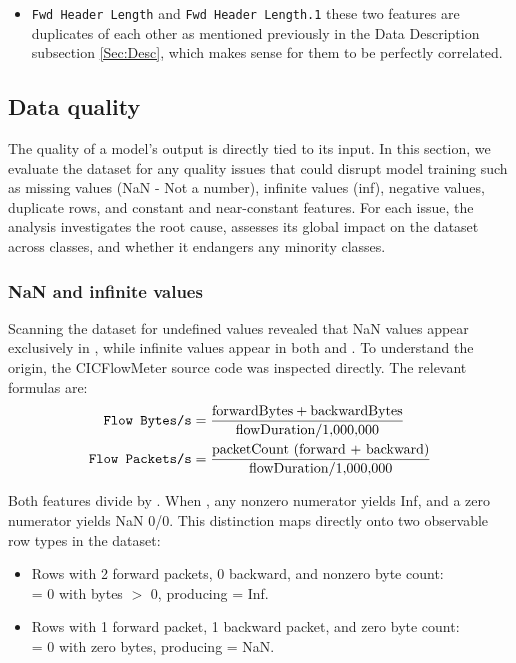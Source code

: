 \begin{itemize}
    \item \texttt{Fwd Header Length} and \texttt{Fwd Header Length.1} these two features are duplicates of each other as mentioned previously in the Data Description subsection \ref{Sec:Desc}, which makes sense for them to be perfectly correlated.
\end{itemize}



\subsection{Data quality}
The quality of a model's output is directly tied to its input. In this section, we evaluate the dataset for any quality issues that could disrupt model training such as missing values (NaN - Not a number), infinite values (inf), negative values, duplicate rows, and constant and near-constant features. For each issue, the analysis investigates the root cause, assesses its global impact on the dataset across classes, and whether it endangers any minority classes.

\subsubsection{NaN and infinite values}

Scanning the dataset for undefined values revealed that NaN values appear exclusively in , while infinite values appear in both  and . To understand the origin, the CICFlowMeter source code was inspected directly.
The relevant formulas are:
\begin{align*}
    \texttt{Flow Bytes/s}   & = \frac{\text{forwardBytes} + \text{backwardBytes}}{\text{flowDuration} / 1{,}000{,}000} \\
    \texttt{Flow Packets/s} & = \frac{\text{packetCount (forward + backward)}}{\text{flowDuration} / 1{,}000{,}000}
\end{align*}

Both features divide by . When , any nonzero numerator yields Inf, and a zero numerator yields NaN 0/0. This distinction maps directly onto two observable row types in the dataset:

\begin{itemize}
    \item Rows with 2 forward packets, 0 backward, and nonzero byte count:\\
           = 0 with bytes $>$ 0, producing  = Inf.
    \item Rows with 1 forward packet, 1 backward packet, and zero byte count:\\
           = 0 with zero bytes, producing  = NaN.
\end{itemize}

